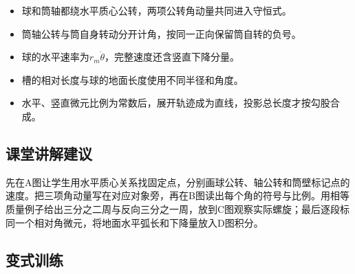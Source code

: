 \documentclass[UTF8,fontset=fandol,a4paper,11pt]{ctexart}
\begin{document}
\begin{itemize}
\item 球和筒轴都绕水平质心公转，两项公转角动量共同进入守恒式。
\item 筒轴公转与筒自身转动分开计角，按同一正向保留筒自转的负号。
\item 球的水平速率为$r_m\dot\theta$，完整速度还含竖直下降分量。
\item 槽的相对长度与球的地面长度使用不同半径和角度。
\item 水平、竖直微元比例为常数后，展开轨迹成为直线，投影总长度才按勾股合成。\end{itemize}



\subsection*{课堂讲解建议}

先在A图让学生用水平质心关系找固定点，分别画球公转、轴公转和筒壁标记点的速度。把三项角动量写在对应对象旁，再在B图读出每个角的符号与比例。用相等质量例子给出三分之二周与反向三分之一周，放到C图观察实际螺旋；最后逐段标同一个相对角微元，将地面水平弧长和下降量放入D图积分。



\subsection*{变式训练}
\end{document}
